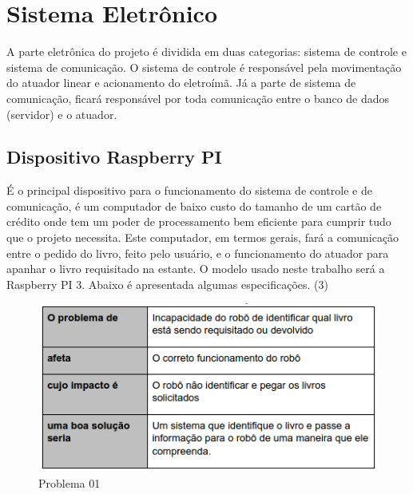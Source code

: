 \chapter[Sistema Eletrônico] {Sistema Eletrônico}
A parte eletrônica do projeto é dividida em duas categorias: sistema de controle e sistema de comunicação. O sistema de controle é responsável pela movimentação do atuador linear e acionamento do eletroímã. Já a parte de sistema de comunicação, ficará responsável por toda comunicação entre o banco de dados (servidor) e o atuador.

\section{Dispositivo Raspberry PI}
É o principal dispositivo para o funcionamento do sistema de controle e de comunicação, é um computador de baixo custo do tamanho de um cartão de crédito onde tem um poder de processamento bem eficiente para cumprir tudo que o projeto necessita. Este computador, em termos gerais, fará a comunicação entre o pedido do livro, feito pelo usuário, e o funcionamento do atuador para apanhar o livro requisitado na estante. O modelo usado neste trabalho será a Raspberry PI 3. Abaixo é apresentada algumas especificações. (3)

\begin{figure}[!h]
\centering
\includegraphics[scale=0.65, angle = 360]{figuras/descricao_problema1}
\caption[]{Problema 01 \footnotemark}
\end{figure}
\FloatBarrier


